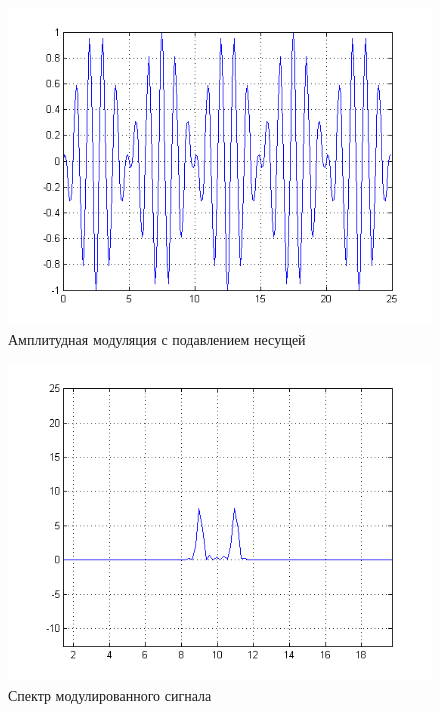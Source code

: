 \documentclass[a4paper, 12pt]{article}
\begin{document}
\begin{figure}[H]
   \includegraphics[scale=0.7]{lab7/ammod.png}
   \caption{Амплитудная модуляция с подавлением несущей}
\end{figure}

\begin{figure}[H]
   \includegraphics[scale=0.7]{lab7/ammod_spectro.png}
   \caption{Спектр модулированного сигнала}
\end{figure}
\end{document}
